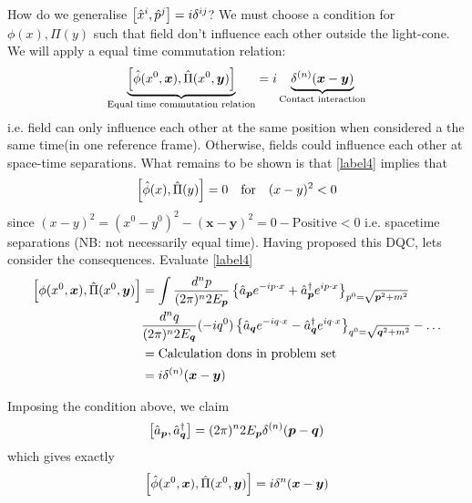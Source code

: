 How do we generalise $\comm{\hat{x}^i}{\hat{p}^j} = i\delta^{ij}$?
We must choose a condition for $\phi(x), \Pi (y)$ such that field don't influence each other outside the light-cone. We will apply a equal time commutation relation:
\begin{align}\label{label4}
    \underbrace{\comm{\hat{\phi} (x^0, \bm{x})}{\hat{\Pi}(x^0, \bm{y})}}_\text{Equal time commutation relation} = i\underbrace{ \delta^{(n)} (\bm{x} - \bm{y}) }_\text{Contact interaction}
\end{align}
i.e. field can only influence each other at the same position when considered a the same time(in one reference frame).  Otherwise, fields could influence each other at space-time separations. What remains to be shown is that \eqref{label4} implies that
\begin{equation}
    \comm{\hat{\phi}(x)}{\hat{\Pi}(y)} = 0 \quad \text{for} \quad (x - y)^2 < 0
\end{equation}
since $(x-y)^2 = (x^0 - y^0)^2 - (\bm{x} - \bm{y})^2 = 0 - \text{Positive} < 0$
i.e. spacetime separations (NB: not necessarily equal time). Having proposed this DQC, lets consider the consequences. Evaluate \eqref{label4}
\begin{align}
    \comm{\phi (x^0, \bm{x})}{\hat{\Pi} (x^0, \bm{y})}& =  \int \frac{d^n p}{(2\pi)^n 2E_{\bm{p}}} \left\{ \hat{a}_{\bm{p}} e^{-ip\cdot x} + \hat{a}_{\bm{p}}^{\dagger} e^{ip\cdot x} \right\}_{p^0 = \sqrt{\bm{p}^2 + m^2}}  \nonumber\\
    & \frac{d^n q}{(2\pi)^n 2E_{\bm{q}}} (-iq^0) \left\{ \hat{a}_{\bm{q}} e^{-iq\cdot x} - \hat{a}_{\bm{q}}^{\dagger} e^{iq\cdot x} \right\}_{q^0 = \sqrt{\bm{q}^2 + m^2}} - \dots \nonumber\\
    & = \text{Calculation dons in problem set} \nonumber\\
    & = i\delta^{(n)} (\bm{x} - \bm{y})
\end{align}

Imposing the condition above, we claim
\begin{equation}
    \comm{\hat{a}_{\bm{p}}}{\hat{a}_{\bm{q}}^{\dagger}} = (2\pi)^n 2E_{\bm{p}} \delta^{(n)} (\bm{p} - \bm{q})
\end{equation}
which gives exactly
\begin{equation}
    \comm{\hat{\phi}(x^0, \bm{x})}{\hat{\Pi}  (x^0, \bm{y}) } = i\delta^{n} (\bm{x} - \bm{y})
\end{equation}


